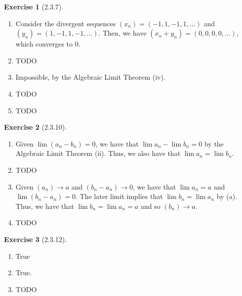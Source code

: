 \documentclass{amsart}
\theoremstyle{definition}
\newtheorem{exercise}{Exercise}
\begin{document}
\begin{exercise}[2.3.7]
  \begin{enumerate}[label={(\alph*)}]
    \item Consider the divergent sequences $(x_n) = (-1, 1, -1, 1, \ldots)$ and
      $(y_n) = (1, -1, 1, -1, \ldots)$. Then, we have $(x_n + y_n) = (0, 0, 0,
      0, \ldots)$, which converges to 0.
    \item TODO
    \item Impossible, by the Algebraic Limit Theorem (iv).
    \item TODO
    \item TODO
  \end{enumerate}
\end{exercise}

\begin{exercise}[2.3.10]
  \begin{enumerate}[label={(\alph*)}]
    \item Given $\lim(a_n - b_n) = 0$, we have that $\lim{a_n} - \lim{b_n} =
      0$ by the Algebraic Limit Theorem (ii). Thus, we also have that $\lim{a_n}
      = \lim{b_n}$.
    \item TODO
    \item Given $(a_n) \rightarrow a$ and $(b_n - a_n) \rightarrow 0$, we have
      that $\lim{a_n} = a$ and $\lim(b_n - a_n) = 0$. The later limit implies
      that $\lim{b_n} = \lim{a_n}$ by (a). Thus, we have that $\lim{b_n} =
      \lim{a_n} = a$ and so $(b_n) \rightarrow a$.
    \item TODO
  \end{enumerate}
\end{exercise}

\begin{exercise}[2.3.12]
  \begin{enumerate}[label={(\alph*)}]
    \item True
    \item True.
    \item TODO
  \end{enumerate}
\end{exercise}
\end{document}
